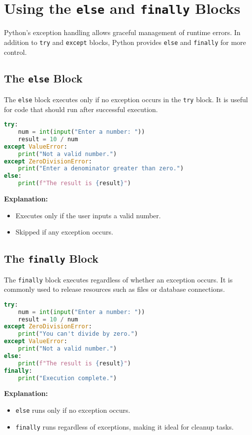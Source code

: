 \section{Using the \texttt{else} and \texttt{finally} Blocks}

Python's exception handling allows graceful management of runtime errors. In addition to \texttt{try} and \texttt{except} blocks, Python provides \texttt{else} and \texttt{finally} for more control.

\subsection{The \texttt{else} Block}

The \texttt{else} block executes only if no exception occurs in the \texttt{try} block. It is useful for code that should run after successful execution.

\begin{lstlisting}[language=Python]
try:
    num = int(input("Enter a number: "))
    result = 10 / num
except ValueError:
    print("Not a valid number.")
except ZeroDivisionError:
    print("Enter a denominator greater than zero.")
else:
    print(f"The result is {result}")
\end{lstlisting}

\textbf{Explanation:}  
\begin{itemize}
    \item Executes only if the user inputs a valid number.
    \item Skipped if any exception occurs.
\end{itemize}

\subsection{The \texttt{finally} Block}

The \texttt{finally} block executes regardless of whether an exception occurs. It is commonly used to release resources such as files or database connections.

\begin{lstlisting}[language=Python]
try:
    num = int(input("Enter a number: "))
    result = 10 / num
except ZeroDivisionError:
    print("You can't divide by zero.")
except ValueError:
    print("Not a valid number.")
else:
    print(f"The result is {result}")
finally:
    print("Execution complete.")
\end{lstlisting}

\textbf{Explanation:}  
\begin{itemize}
    \item \texttt{else} runs only if no exception occurs.
    \item \texttt{finally} runs regardless of exceptions, making it ideal for cleanup tasks.
\end{itemize}

